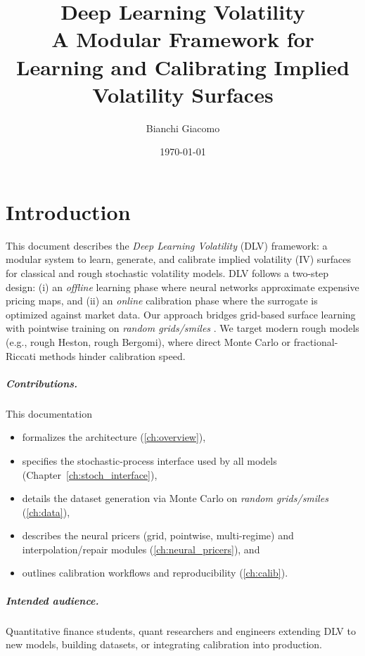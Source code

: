 \title{Deep Learning Volatility\\\large A Modular Framework for Learning and Calibrating Implied Volatility Surfaces}
\author{Bianchi Giacomo}
\date{\today}


	\maketitle
	\tableofcontents
	
	\chapter{Introduction}
	\label{ch:intro}
	This document describes the \emph{Deep Learning Volatility} (DLV) framework: a modular system to learn, generate, and calibrate implied volatility (IV) surfaces for classical and rough stochastic volatility models. DLV follows a two-step design: (i) an \emph{offline} learning phase where neural networks approximate expensive pricing maps, and (ii) an \emph{online} calibration phase where the surrogate is optimized against market data. Our approach bridges grid-based surface learning \citep{Horvath2021DLV} with pointwise training on \emph{random grids/smiles} \citep{Baschetti2024DeepCalibrationRandomGrids}. We target modern rough models (e.g., rough Heston, rough Bergomi), where direct Monte Carlo or fractional-Riccati methods hinder calibration speed.
	
	\paragraph{Contributions.} This documentation
	\begin{itemize}[nosep]
		\item formalizes the architecture (\cref{ch:overview}),
		\item specifies the stochastic-process interface used by all models (Chapter~\ref{ch:stoch_interface}),
		\item details the dataset generation via Monte Carlo on \emph{random grids/smiles} (\cref{ch:data}),
		\item describes the neural pricers (grid, pointwise, multi-regime) and interpolation/repair modules (\cref{ch:neural_pricers}), and
		\item outlines calibration workflows and reproducibility (\cref{ch:calib}).
	\end{itemize}
	
	\paragraph{Intended audience.} Quantitative finance students, quant researchers and engineers extending DLV to new models, building datasets, or integrating calibration into production.
	
